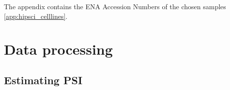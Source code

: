 The appendix contains the ENA Accession Numbers of the chosen samples \ref{app:hipsci_celllines}.


\section{Data processing}\label{sec:dataprocessing}
\subsection{Estimating PSI} \label{subsec:psiestimation}






